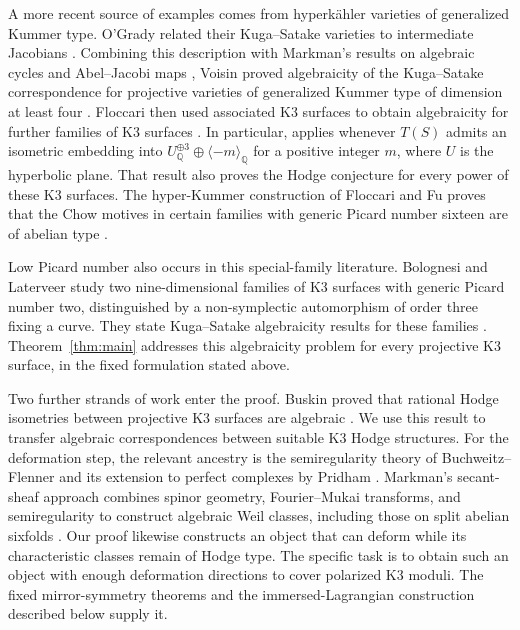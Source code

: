 \documentclass[11pt]{article}
\numberwithin{equation}{section}
\theoremstyle{definition}
\theoremstyle{remark}
\newcommand{\Q}{\mathbb Q}
\begin{document}
A more recent source of examples comes from hyperk\"ahler
varieties of generalized Kummer type.  O'Grady related their
Kuga--Satake varieties to intermediate Jacobians
\cite{History:OGrady}.  Combining this description with
Markman's results on algebraic cycles and Abel--Jacobi maps
\cite{History:MarkmanKummer}, Voisin proved algebraicity of the
Kuga--Satake correspondence for projective varieties of generalized
Kummer type of dimension at least four
\cite[Theorem~0.5]{History:VoisinKummer}.
Floccari then used associated K3 surfaces to obtain algebraicity
for further families of K3 surfaces
\cite{History:Floccari2024,History:Floccari2026}.  In particular,
\cite[Theorem~5.11]{History:Floccari2026} applies whenever
$T(S)$ admits an isometric embedding into
$U_\Q^{\oplus 3}\oplus\langle-m\rangle_\Q$ for a positive
integer $m$, where $U$ is the hyperbolic plane.  That result
also proves the Hodge conjecture for every power of these K3
surfaces.  The hyper-Kummer construction of Floccari and Fu
proves that the Chow motives in certain families with generic
Picard number sixteen are of abelian type
\cite{History:FloccariFu}.

Low Picard number also occurs in this special-family literature.
Bolognesi and Laterveer study two nine-dimensional families of K3
surfaces with generic Picard number two, distinguished by a
non-symplectic automorphism of order three fixing a curve.  They
state Kuga--Satake algebraicity results for these families
\cite[Theorem~4.4, Propositions~6.2 and~6.4]{History:BolognesiLaterveer}.
Theorem~\ref{thm:main} addresses this algebraicity problem for
every projective K3 surface, in the fixed formulation stated
above.

Two further strands of work enter the proof.  Buskin proved that
rational Hodge isometries between projective K3 surfaces are
algebraic \cite{Deformation:Buskin}.  We use this result to
transfer algebraic correspondences between suitable K3 Hodge
structures.  For the deformation step, the relevant ancestry
is the semiregularity theory of Buchweitz--Flenner and its
extension to perfect complexes by Pridham
\cite{Deformation:BF2003,Deformation:Pridham}.
Markman's secant-sheaf approach combines spinor geometry,
Fourier--Mukai transforms, and semiregularity to construct
algebraic Weil classes, including those on split abelian
sixfolds \cite{History:MarkmanSecant,History:MarkmanSurvey}.
Our proof likewise constructs an object that can deform while
its characteristic classes remain of Hodge type.  The
specific task is to obtain such an object with enough
deformation directions to cover polarized K3 moduli.
The fixed mirror-symmetry theorems and the immersed-Lagrangian
construction described below supply it.
\end{document}
